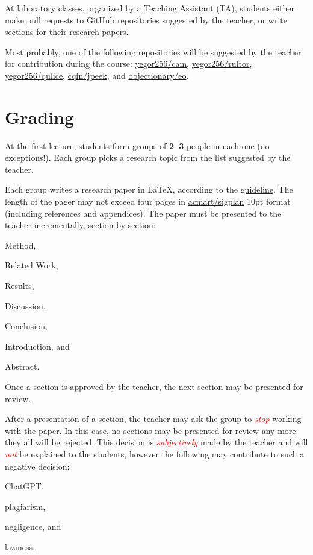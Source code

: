 \documentclass[nobrand,anonymous,nodate,nosecurity]{huawei}
\begin{document}
{At laboratory classes, organized by a Teaching Assistant (TA),
students either make pull requests to
GitHub repositories suggested by the teacher, or write sections
for their research papers.

Most probably, one of the following repositories will be suggested
by the teacher for contribution during the course:
\href{https://github.com/yegor256/cam}{yegor256/cam},
\href{https://github.com/yegor256/rultor}{yegor256/rultor},
\href{https://github.com/yegor256/qulice}{yegor256/qulice},
\href{https://github.com/cqfn/jpeek}{cqfn/jpeek},
and
\href{https://github.com/objectionary/eo}{objectionary/eo}.

\newpage
\section*{Grading}

At the first lecture, students form groups of \textbf{2--3} people in each one (no exceptions!).
Each group picks a research topic from the list suggested by the teacher.

Each group writes a research paper in \LaTeX, according
to the \href{https://www.yegor256.com/2022/08/24/research-paper-template.html}{guideline}.
The length of the pager may not exceed four pages in
\href{https://ctan.org/pkg/acmart}{acmart/sigplan} 10pt format
(including references and appendices).
The paper must be presented to the teacher incrementally, section by section:
\begin{inparaenum}[1)]
\item Method,
\item Related Work,
\item Results,
\item Discussion,
\item Conclusion,
\item Introduction,
and
\item Abstract.
\end{inparaenum}
Once a section is approved by the teacher, the next section may be presented for review.

\newcommand\angry[1]{\textcolor{red}{\emph{#1}}}
After a presentation of a section, the teacher may ask the group to \angry{stop}
working with the paper. In this case, no sections may be presented for review any more: they all will be rejected.
This decision is \angry{subjectively} made by the teacher and will \angry{not} be explained
to the students, however the following may contribute to such a
negative decision:
\begin{inparaenum}[a)]
    \item ChatGPT,
    \item plagiarism,
    \item negligence,
    and
    \item laziness.
\end{inparaenum}

}
\end{document}
